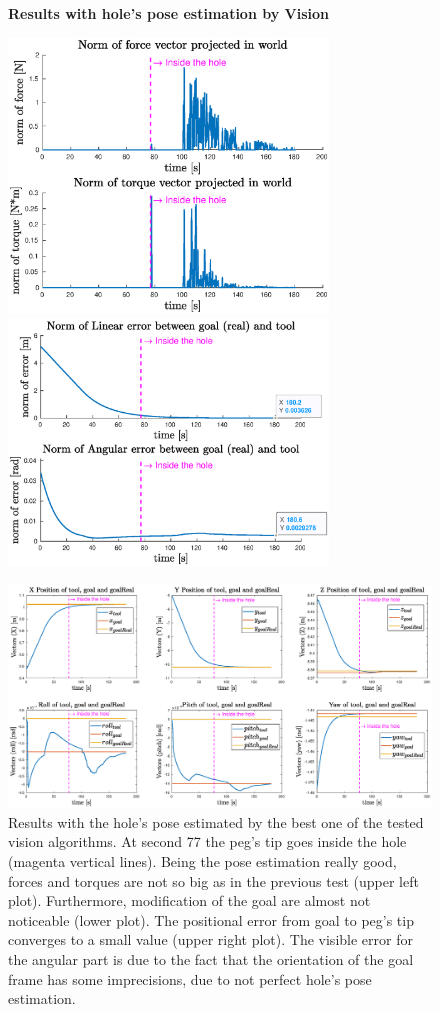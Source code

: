 \begin{figure}[H]
	\centering
	\textbf{Results with hole's pose estimation by Vision}\\
	\vspace*{20px}
	\centerline{
		\includegraphics[width=8.5cm]{withVisio/forceNorm.eps}
		\includegraphics[width=8.5cm]{withVisio/errorNorm.eps}
	}
	\vspace{30px}
	\centerline{
		\includegraphics[width=19.5cm]{withVisio/6_error.eps}
	}
	\vspace{10px}
	\caption[Plots of results with hole's pose estimation by Vision]{Results with the hole's pose estimated by the best one of the tested vision algorithms. At second 77 the peg's tip goes inside the hole (magenta vertical lines). Being the pose estimation really good, forces and torques are not so big  as in the previous test (upper left plot). Furthermore, modification of the goal are almost not noticeable (lower plot). The positional error from goal to peg's tip  converges to a small value (upper right plot). The visible error for the angular part is due to the fact that the orientation of the goal frame has some imprecisions, due to not perfect hole's pose estimation.}
	\label{fig:expWithVisio}
\end{figure}

